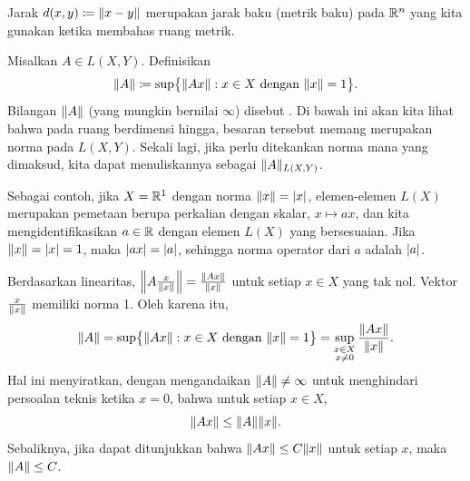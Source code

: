 Jarak
$d(x,y) \coloneqq \lVert {x-y} \rVert$ merupakan jarak baku
(metrik baku) pada ${\mathbb{R}}^n$ yang
kita gunakan ketika membahas ruang metrik.

\begin{defn}
Misalkan $A \in L(X,Y)$.  Definisikan
\begin{equation*}
\lVert {A} \rVert \coloneqq
\sup \bigl\{ \lVert {Ax} \rVert : x \in X \text{ dengan } \lVert {x} \rVert = 1 \bigr\} .
\end{equation*}
Bilangan $\lVert {A} \rVert$ (yang mungkin bernilai $\infty$)
disebut \emph{}.  Di bawah ini akan kita lihat
bahwa pada ruang berdimensi hingga, besaran tersebut memang merupakan norma pada $L(X,Y)$.
Sekali lagi, jika perlu ditekankan norma mana yang dimaksud, kita dapat
menuliskannya sebagai $\lVert {A} \rVert_{L(X,Y)}$.
\end{defn}

Sebagai contoh, jika $X={\mathbb{R}}^1$ dengan norma $\lVert {x} \rVert=\lvert {x} \rvert$, elemen-elemen $L(X)$
merupakan pemetaan berupa perkalian dengan skalar, $x \mapsto ax$, dan kita mengidentifikasikan $a \in {\mathbb{R}}$ dengan
elemen $L(X)$ yang bersesuaian.  Jika $\lVert {x} \rVert=\lvert {x} \rvert=1$, maka $\lvert {a x} \rvert = \lvert {a} \rvert$, sehingga
norma operator dari $a$ adalah $\lvert {a} \rvert$.

Berdasarkan linearitas,
$\left\lVert {A \frac{x}{\lVert {x} \rVert}} \right\rVert = \frac{\lVert {Ax} \rVert}{\lVert {x} \rVert}$
untuk setiap $x \in X$ yang tak nol.
Vektor $\frac{x}{\lVert {x} \rVert}$ memiliki norma 1.
Oleh karena itu,
\begin{equation*}
\lVert {A} \rVert =
\sup \bigl\{ \lVert {Ax} \rVert : x \in X \text{ dengan } \lVert {x} \rVert = 1 \bigr\}
=
\sup_{\substack{x \in X\\x\neq 0}} \frac{\lVert {Ax} \rVert}{\lVert {x} \rVert} .
\end{equation*}
Hal ini menyiratkan, dengan mengandaikan $\lVert {A} \rVert \neq \infty$ untuk menghindari persoalan teknis ketika $x=0$,
bahwa untuk setiap $x \in X$,
\begin{equation*}
\snorm{Ax} \leq \snorm{A}  \snorm{x} .
\avoidbreak
\end{equation*}
Sebaliknya, jika dapat ditunjukkan bahwa $\lVert {Ax} \rVert \leq C \lVert {x} \rVert$ untuk setiap $x$,
maka $\lVert {A} \rVert \leq C$.


